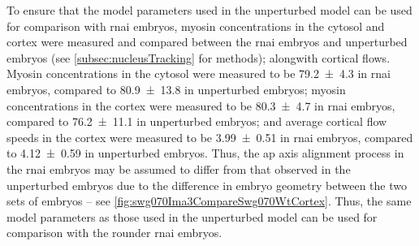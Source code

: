 To ensure that the model parameters used in the unperturbed model can be used for comparison with  \ac{rnai} embryos, myosin concentrations in the cytosol and cortex were measured and compared between the  \ac{rnai} embryos and unperturbed embryos (see \autoref{subsec:nucleusTracking} for methods); alongwith cortical flows. Myosin concentrations in the cytosol were measured to be \SI{79.2 +- 4.3}{\unitMyosinConc} in  \ac{rnai} embryos, compared to \SI{80.9 +- 13.8}{\unitMyosinConc} in unperturbed embryos; myosin concentrations in the cortex were measured to be \SI{80.3 +- 4.7}{\unitMyosinConc} in  \ac{rnai} embryos, compared to \SI{76.2 +- 11.1}{\unitMyosinConc} in unperturbed embryos; and average cortical flow speeds in the cortex were measured to be \SI{3.99 +- 0.51}{\unitMyosinConc} in  \ac{rnai} embryos, compared to \SI{4.12 +- 0.59}{\unitMyosinConc} in unperturbed embryos. Thus, the \ac{ap} axis alignment process in the  \ac{rnai} embryos may be assumed to differ from that observed in the unperturbed embryos due to the difference in embryo geometry between the two sets of embryos -- see \autoref{fig:swg070Ima3CompareSwg070WtCortex}. Thus, the same model parameters as those used in the unperturbed model can be used for comparison with the rounder   \ac{rnai} embryos.


